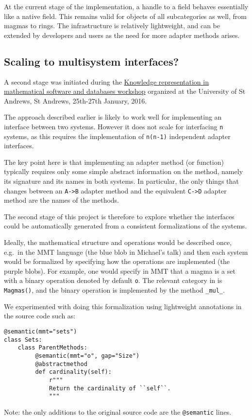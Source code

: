 At the current stage of the implementation, a handle to a \GAP field
behaves essentially like a native \Sage field. This remains valid for
objects of all subcategories as well, from magmas to rings. The
infrastructure is relatively lightweight, and can be extended by
developers and users as the need for more adapter methods arises.

\subsection{Scaling to multisystem interfaces?}\label{scaling-to-multisystem-interfaces}

A second stage was initiated during the
\href{http://opendreamkit.org/2015/12/08/WP6StAndrewsMeeting/}{Knowledge
representation in mathematical software and databases workshop}
organized at the University of St Andrews, St Andrews, 25th-27th
January, 2016.

The approach described earlier is likely to work well for implementing
an interface between two systems. However it does not scale for
interfacing \texttt{n} systems, as this requires the implementation of
\texttt{n(n-1)} independent adapter interfaces.

The key point here is that implementing an adapter method (or
function) typically requires only some simple abstract information on
the method, namely its signature and its names in both systems.  In
particular, the only things that changes between an \texttt{A->B}
adapter method and the equivalent \texttt{C->D} adapter method are the
names of the methods.

The second stage of this project is therefore to explore whether the
interfaces could be automatically generated from a consistent
formalizations of the systems.


Ideally, the mathematical structure and operations would be described
once, e.g.~in the MMT language (the blue blob in Michael's talk) and
then each system would be formalized by specifying how the operations
are implemented (the purple blobs). For example, one would specify in
MMT that a magma is a set with a binary operation denoted by default
\texttt{o}. The relevant category in \Sage is \texttt{Magmas()}, and
the binary operation is implemented by the method \texttt{\_mul\_}.

We experimented with doing this formalization using lightweight
annotations in the \Sage source code such as:
\begin{lstlisting}
@semantic(mmt="sets")
class Sets:
    class ParentMethods:
         @semantic(mmt="o", gap="Size")
         @abstractmethod
         def cardinality(self):
             r"""
             Return the cardinality of ``self``.
             """
\end{lstlisting}
Note: the only additions to the original source code are the \texttt{@semantic} lines.


